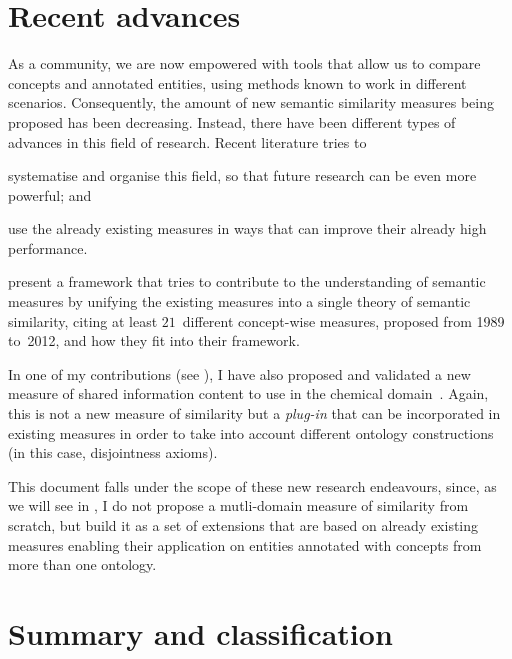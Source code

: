 \section{Recent advances} \label{sec:sota/recent}

As a community, we are now empowered with tools that allow us to compare concepts and annotated entities, using methods known to work in different scenarios. Consequently, the amount of new semantic similarity measures being proposed has been decreasing. Instead, there have been different types of advances in this field of research. Recent literature tries to
\begin{paralist}
    \item systematise and organise this field, so that future research can be even more powerful; and
    \item use the already existing measures in ways that can improve their already high performance.
\end{paralist}

\citet{Harispe2014} present a framework that tries to contribute to the understanding of semantic measures by unifying the existing measures into a single theory of semantic similarity, citing at least $21$~different concept-wise measures, proposed from 1989 to~2012, and how they fit into their framework.

In one of my contributions (see ), I have also proposed and validated a new measure of shared information content to use in the chemical domain~\citep{Ferreira2013}. Again, this is not a new measure of similarity but a \emph{plug-in} that can be incorporated in existing measures in order to take into account different ontology constructions (in this case, disjointness axioms).

This document falls under the scope of these new research endeavours, since, as we will see in , I do not propose a mutli-domain measure of similarity from scratch, but build it as a set of extensions that are based on already existing measures enabling their application on entities annotated with concepts from more than one ontology.


\section{Summary and classification} \label{sec:sota/summary}

